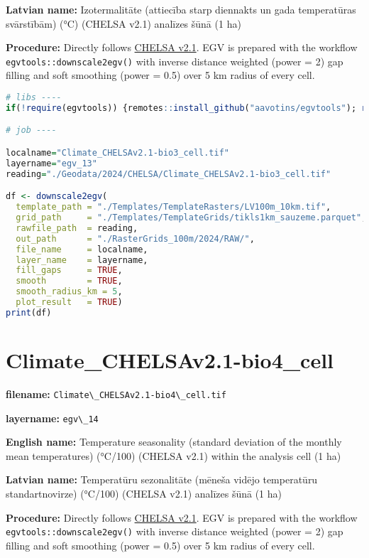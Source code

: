 \documentclass[
]{book}
\newcommand{\passthrough}[1]{#1}
\begin{document}
\textbf{Latvian name:} Izotermalitāte (attiecība starp diennakts un gada temperatūras svārstībām) (°C) (CHELSA v2.1) analīzes šūnā (1 ha)

\textbf{Procedure:} Directly follows \hyperref[Ch04.11]{CHELSA v2.1}. EGV is prepared with the
workflow \passthrough{\lstinline!egvtools::downscale2egv()!} with inverse distance weighted (power = 2)
gap filling and soft smoothing (power = 0.5) over 5 km radius of every cell.

\begin{lstlisting}[language=R]
# libs ----
if(!require(egvtools)) {remotes::install_github("aavotins/egvtools"); require(egvtools)}

# job ----

localname="Climate_CHELSAv2.1-bio3_cell.tif"
layername="egv_13"
reading="./Geodata/2024/CHELSA/Climate_CHELSAv2.1-bio3_cell.tif"

df <- downscale2egv(
  template_path = "./Templates/TemplateRasters/LV100m_10km.tif",
  grid_path     = "./Templates/TemplateGrids/tikls1km_sauzeme.parquet",
  rawfile_path  = reading,
  out_path      = "./RasterGrids_100m/2024/RAW/",
  file_name     = localname,
  layer_name    = layername,
  fill_gaps     = TRUE,
  smooth        = TRUE,
  smooth_radius_km = 5,
  plot_result   = TRUE)
print(df)
\end{lstlisting}

\section{Climate\_CHELSAv2.1-bio4\_cell}\label{ch06.014}

\textbf{filename:} \passthrough{\lstinline!Climate\_CHELSAv2.1-bio4\_cell.tif!}

\textbf{layername:} \passthrough{\lstinline!egv\_14!}

\textbf{English name:} Temperature seasonality (standard deviation of the monthly mean temperatures) (°C/100) (CHELSA v2.1) within the analysis cell (1 ha)

\textbf{Latvian name:} Temperatūru sezonalitāte (mēneša vidējo temperatūru standartnovirze) (°C/100) (CHELSA v2.1) analīzes šūnā (1 ha)

\textbf{Procedure:} Directly follows \hyperref[Ch04.11]{CHELSA v2.1}. EGV is prepared with the
workflow \passthrough{\lstinline!egvtools::downscale2egv()!} with inverse distance weighted (power = 2)
gap filling and soft smoothing (power = 0.5) over 5 km radius of every cell.
\end{document}
